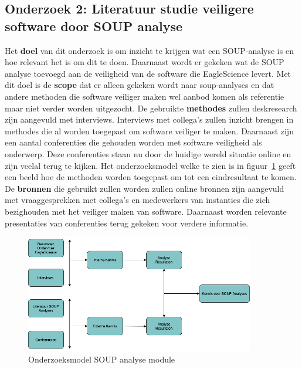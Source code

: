 \subsection{Onderzoek 2: Literatuur studie veiligere software door SOUP analyse}\label{sec:onderzoek:-literatuur-studie-soup}
Het \textbf{doel} van dit onderzoek is om inzicht te krijgen wat een SOUP-analyse is en hoe relevant het is om dit te doen. Daarnaast wordt er gekeken wat de SOUP analyse toevoegd aan de veiligheid van de software die EagleScience levert. Met dit doel is de \textbf{scope} dat er alleen gekeken wordt naar soup-analyses en dat andere methoden die software veiliger maken wel aanbod komen als referentie maar niet verder worden uitgezocht.  De gebruikte \textbf{methodes} zullen deskresearch zijn aangevuld met interviews. Interviews met collega's zullen inzicht brengen in methodes die al worden toegepast om software veiliger te maken. Daarnaast zijn een aantal conferenties die gehouden worden met software veiligheid als onderwerp. Deze conferenties staan nu door de huidige wereld situatie online en zijn veelal terug te kijken. Het onderzoeksmodel welke te zien is in figuur~\ref{fig:OnderzoeksModelNoodZaakSOUP} geeft een beeld hoe de methoden worden toegepast om tot een eindresultaat te komen. De \textbf{bronnen} die gebruikt zullen worden zullen online bronnen zijn aangevuld met vraaggesprekken met collega's en medewerkers van instanties die zich bezighouden met het veiliger maken van software. Daarnaast worden relevante presentaties van conferenties terug gekeken voor verdere informatie.
\begin{figure}[htbp]
    \myfloatalign
    \includegraphics[width=10cm]{gfx/OnderzoeksmodelSOUP}
    \caption{Onderzoeksmodel SOUP analyse module}
    \label{fig:OnderzoeksModelNoodZaakSOUP}
\end{figure}


